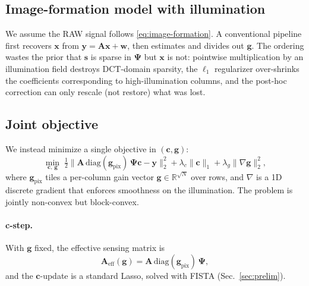 \documentclass{article}
\begin{document}
\subsection{Image-formation model with illumination}

We assume the RAW signal follows \eqref{eq:image-formation}. A conventional pipeline first recovers $\boldsymbol{x}$ from $\boldsymbol{y} = \boldsymbol{A}\boldsymbol{x} + \boldsymbol{w}$, then estimates and divides out $\boldsymbol{g}$. The ordering wastes the prior that $\boldsymbol{s}$ is sparse in $\boldsymbol{\Psi}$ but $\boldsymbol{x}$ is not: pointwise multiplication by an illumination field destroys DCT-domain sparsity, the $\ell_1$ regularizer over-shrinks the coefficients corresponding to high-illumination columns, and the post-hoc correction can only rescale (not restore) what was lost.

\subsection{Joint objective}

We instead minimize a single objective in $(\boldsymbol{c}, \boldsymbol{g})$:
\begin{equation}
  \min_{\boldsymbol{c},\,\boldsymbol{g}}\;
  \tfrac{1}{2}\big\|\boldsymbol{A}\,\mathrm{diag}(\boldsymbol{g}_\text{pix})\,
    \boldsymbol{\Psi}\boldsymbol{c} - \boldsymbol{y}\big\|_2^2
  + \lambda_c \|\boldsymbol{c}\|_1
  + \lambda_g \|\nabla \boldsymbol{g}\|_2^2,
  \label{eq:joint}
\end{equation}
where $\boldsymbol{g}_\text{pix}$ tiles a per-column gain vector $\boldsymbol{g} \in \mathbb{R}^{\sqrt{N}}$ over rows, and $\nabla$ is a 1D discrete gradient that enforces smoothness on the illumination. The problem is jointly non-convex but block-convex.

\paragraph{c-step.} With $\boldsymbol{g}$ fixed, the effective sensing matrix is
\begin{equation}
  \boldsymbol{A}_{\text{eff}}(\boldsymbol{g}) = \boldsymbol{A}\,\mathrm{diag}(\boldsymbol{g}_\text{pix})\,\boldsymbol{\Psi},
\end{equation}
and the $\boldsymbol{c}$-update is a standard Lasso, solved with FISTA (Sec.~\ref{sec:prelim}).
\end{document}
